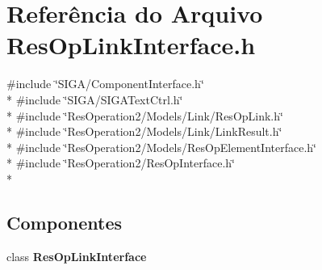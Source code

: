 \section{Referência do Arquivo Res\+Op\+Link\+Interface.\+h}
\label{_res_op_link_interface_8h}
{\ttfamily \#include \char`\"{}S\+I\+G\+A/\+Component\+Interface.\+h\char`\"{}}\\*
{\ttfamily \#include \char`\"{}S\+I\+G\+A/\+S\+I\+G\+A\+Text\+Ctrl.\+h\char`\"{}}\\*
{\ttfamily \#include \char`\"{}Res\+Operation2/\+Models/\+Link/\+Res\+Op\+Link.\+h\char`\"{}}\\*
{\ttfamily \#include \char`\"{}Res\+Operation2/\+Models/\+Link/\+Link\+Result.\+h\char`\"{}}\\*
{\ttfamily \#include \char`\"{}Res\+Operation2/\+Models/\+Res\+Op\+Element\+Interface.\+h\char`\"{}}\\*
{\ttfamily \#include \char`\"{}Res\+Operation2/\+Res\+Op\+Interface.\+h\char`\"{}}\\*
\subsection*{Componentes}
\begin{DoxyCompactItemize}
\item 
class {\bf Res\+Op\+Link\+Interface}
\end{DoxyCompactItemize}
